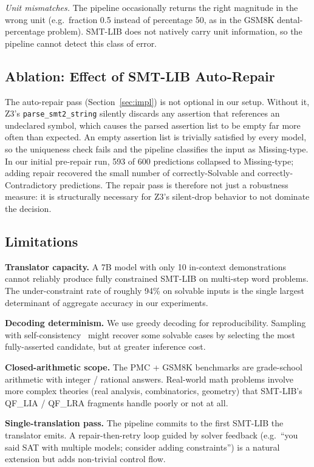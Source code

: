 \documentclass[sigconf, nonacm, onecolumn]{acmart}
\begin{document}
\emph{Unit mismatches.} The pipeline occasionally returns the right
magnitude in the wrong unit (e.g.~fraction 0.5 instead of percentage
50, as in the GSM8K dental-percentage problem). SMT-LIB does not
natively carry unit information, so the pipeline cannot detect this
class of error.

\subsection{Ablation: Effect of SMT-LIB Auto-Repair}

The auto-repair pass (Section~\ref{sec:impl}) is not optional in our
setup. Without it, Z3's
\texttt{parse\_smt2\_string} silently discards any assertion that
references an undeclared symbol, which causes the parsed assertion
list to be empty far more often than expected. An empty assertion list
is trivially satisfied by every model, so the uniqueness check fails
and the pipeline classifies the input as Missing-type. In our initial
pre-repair run, 593 of 600 predictions collapsed to Missing-type;
adding repair recovered the small number of correctly-Solvable and
correctly-Contradictory predictions. The repair pass is therefore not
just a robustness measure: it is structurally necessary for Z3's
silent-drop behavior to not dominate the decision.

\subsection{Limitations}

\textbf{Translator capacity.} A 7B model with only 10 in-context
demonstrations cannot reliably produce fully constrained SMT-LIB on
multi-step word problems. The under-constraint rate of roughly 94\% on
solvable inputs is the single largest determinant of aggregate
accuracy in our experiments.

\textbf{Decoding determinism.} We use greedy decoding for
reproducibility. Sampling with self-consistency~\cite{wang2023sc}
might recover some solvable cases by selecting the most fully-asserted
candidate, but at greater inference cost.

\textbf{Closed-arithmetic scope.} The PMC + GSM8K benchmarks are
grade-school arithmetic with integer / rational answers. Real-world
math problems involve more complex theories (real analysis,
combinatorics, geometry) that SMT-LIB's QF\_LIA / QF\_LRA fragments
handle poorly or not at all.

\textbf{Single-translation pass.} The pipeline commits to the first
SMT-LIB the translator emits. A repair-then-retry loop guided by
solver feedback (e.g.\ ``you said SAT with multiple models; consider
adding constraints'') is a natural extension but adds
non-trivial control flow.
\end{document}
